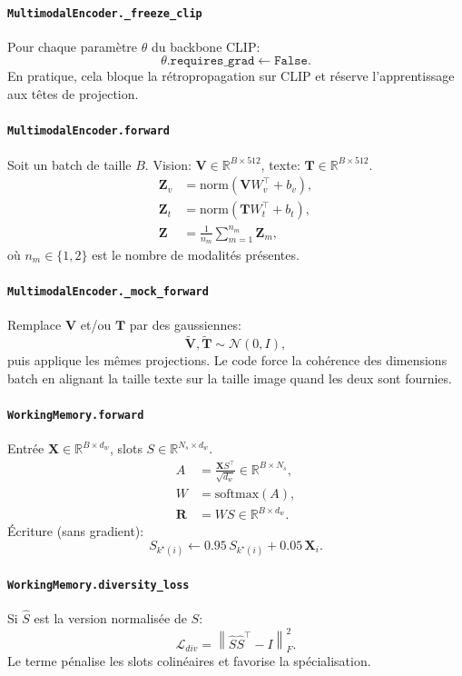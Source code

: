 \documentclass[12pt,a4paper]{article}
\begin{document}
\paragraph{\texttt{MultimodalEncoder.\_freeze\_clip}}
Pour chaque paramètre $\theta$ du backbone CLIP:
\[
\theta.\texttt{requires\_grad} \leftarrow \texttt{False}.
\]
En pratique, cela bloque la rétropropagation sur CLIP et réserve l'apprentissage aux têtes de projection.

\paragraph{\texttt{MultimodalEncoder.forward}}
Soit un batch de taille $B$.  
Vision: $\mathbf{V}\in\mathbb{R}^{B\times512}$, texte: $\mathbf{T}\in\mathbb{R}^{B\times512}$.
\begin{align}
\mathbf{Z}_v &= \mathrm{norm}(\mathbf{V}W_v^\top + b_v),\\
\mathbf{Z}_t &= \mathrm{norm}(\mathbf{T}W_t^\top + b_t),\\
\mathbf{Z} &= \frac{1}{n_m}\sum_{m=1}^{n_m}\mathbf{Z}_m,
\end{align}
où $n_m\in\{1,2\}$ est le nombre de modalités présentes.

\paragraph{\texttt{MultimodalEncoder.\_mock\_forward}}
Remplace $\mathbf{V}$ et/ou $\mathbf{T}$ par des gaussiennes:
\[
\tilde{\mathbf{V}},\tilde{\mathbf{T}} \sim \mathcal{N}(0,I),
\]
puis applique les mêmes projections.  
Le code force la cohérence des dimensions batch en alignant la taille texte sur la taille image quand les deux sont fournies.

\paragraph{\texttt{WorkingMemory.forward}}
Entrée $\mathbf{X}\in\mathbb{R}^{B\times d_w}$, slots $S\in\mathbb{R}^{N_s\times d_w}$.
\begin{align}
A &= \frac{\mathbf{X}S^\top}{\sqrt{d_w}} \in \mathbb{R}^{B\times N_s},\\
W &= \mathrm{softmax}(A),\\
\mathbf{R} &= WS \in \mathbb{R}^{B\times d_w}.
\end{align}
Écriture (sans gradient):
\[
S_{k^\star(i)} \leftarrow 0.95\,S_{k^\star(i)} + 0.05\,\mathbf{X}_i.
\]

\paragraph{\texttt{WorkingMemory.diversity\_loss}}
Si $\hat{S}$ est la version normalisée de $S$:
\[
\mathcal{L}_{div} = \left\| \hat{S}\hat{S}^\top - I \right\|_F^2.
\]
Le terme pénalise les slots colinéaires et favorise la spécialisation.
\end{document}
